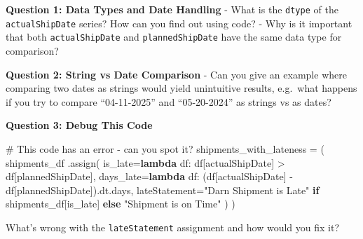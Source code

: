 \documentclass[
  letterpaper,
  DIV=11,
  numbers=noendperiod]{scrartcl}
\newenvironment{Shaded}{\begin{snugshade}}{\end{snugshade}}
\newcommand{\CommentTok}[1]{\textcolor[rgb]{0.37,0.37,0.37}{#1}}
\newcommand{\ControlFlowTok}[1]{\textcolor[rgb]{0.00,0.23,0.31}{\textbf{#1}}}
\newcommand{\KeywordTok}[1]{\textcolor[rgb]{0.00,0.23,0.31}{\textbf{#1}}}
\newcommand{\NormalTok}[1]{\textcolor[rgb]{0.00,0.23,0.31}{#1}}
\newcommand{\OperatorTok}[1]{\textcolor[rgb]{0.37,0.37,0.37}{#1}}
\newcommand{\StringTok}[1]{\textcolor[rgb]{0.13,0.47,0.30}{#1}}
\begin{document}
\begin{tcolorbox}[enhanced jigsaw, colbacktitle=quarto-callout-important-color!10!white, opacitybacktitle=0.6, colframe=quarto-callout-important-color-frame, coltitle=black, left=2mm, titlerule=0mm, title=\textcolor{quarto-callout-important-color}{\faExclamation}\hspace{0.5em}{🤔 Discussion Questions: Assign Mental Model}, bottomtitle=1mm, opacityback=0, arc=.35mm, rightrule=.15mm, colback=white, breakable, bottomrule=.15mm, toprule=.15mm, toptitle=1mm, leftrule=.75mm]

\textbf{Question 1: Data Types and Date Handling} - What is the
\texttt{dtype} of the \texttt{actualShipDate} series? How can you find
out using code? - Why is it important that both \texttt{actualShipDate}
and \texttt{plannedShipDate} have the same data type for comparison?

\textbf{Question 2: String vs Date Comparison} - Can you give an example
where comparing two dates as strings would yield unintuitive results,
e.g.~what happens if you try to compare ``04-11-2025'' and
``05-20-2024'' as strings vs as dates?

\textbf{Question 3: Debug This Code}

\begin{Shaded}
\begin{Highlighting}[]
\CommentTok{\# This code has an error {-} can you spot it?}
\NormalTok{shipments\_with\_lateness }\OperatorTok{=}\NormalTok{ (}
\NormalTok{    shipments\_df}
\NormalTok{    .assign(}
\NormalTok{        is\_late}\OperatorTok{=}\KeywordTok{lambda}\NormalTok{ df: df[}\StringTok{\textquotesingle{}actualShipDate\textquotesingle{}}\NormalTok{] }\OperatorTok{\textgreater{}}\NormalTok{ df[}\StringTok{\textquotesingle{}plannedShipDate\textquotesingle{}}\NormalTok{],}
\NormalTok{        days\_late}\OperatorTok{=}\KeywordTok{lambda}\NormalTok{ df: (df[}\StringTok{\textquotesingle{}actualShipDate\textquotesingle{}}\NormalTok{] }\OperatorTok{{-}}\NormalTok{ df[}\StringTok{\textquotesingle{}plannedShipDate\textquotesingle{}}\NormalTok{]).dt.days,}
\NormalTok{        lateStatement}\OperatorTok{=}\StringTok{"Darn Shipment is Late"} \ControlFlowTok{if}\NormalTok{ shipments\_df[}\StringTok{\textquotesingle{}is\_late\textquotesingle{}}\NormalTok{] }\ControlFlowTok{else} \StringTok{"Shipment is on Time"}
\NormalTok{    )}
\NormalTok{)}
\end{Highlighting}
\end{Shaded}

What's wrong with the \texttt{lateStatement} assignment and how would
you fix it?

\end{tcolorbox}
\end{document}
